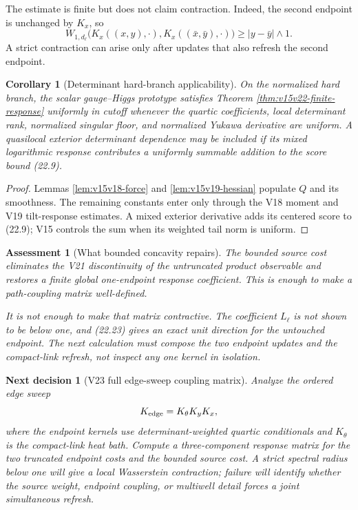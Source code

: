 \documentclass[11pt]{article}
\newtheorem{corollary}[theorem]{Corollary}
\newtheorem{decision}[theorem]{Next decision}
\newtheorem{assessment}[theorem]{Assessment}
\theoremstyle{remark}
\begin{document}
The estimate is finite but does not claim contraction.  Indeed, the
second endpoint is unchanged by \(K_x\), so
\[
 W_{1,d_\ell}
 \bigl(K_x((x,y),\cdot),K_x((\bar x,\bar y),\cdot)\bigr)
 \ge |y-\bar y|\wedge1.                                    \tag{22.23}
\]
A strict contraction can arise only after updates that also refresh
the second endpoint.

\begin{corollary}[Determinant hard-branch applicability]
\label{cor:v15v22-hard}
On the normalized hard branch, the scalar gauge--Higgs prototype
satisfies Theorem \ref{thm:v15v22-finite-response} uniformly in
cutoff whenever the quartic coefficients, local determinant rank,
normalized singular floor, and normalized Yukawa derivative are
uniform.  A quasilocal exterior determinant dependence may be
included if its mixed logarithmic response contributes a uniformly
summable addition to the score bound (22.9).
\end{corollary}

\begin{proof}
Lemmas \ref{lem:v15v18-force} and
\ref{lem:v15v19-hessian} populate \(Q\) and its smoothness.
The remaining constants enter only through the V18 moment and V19
tilt-response estimates.  A mixed exterior derivative adds its
centered score to (22.9); V15 controls the sum when its weighted
tail norm is uniform.
\end{proof}

\begin{assessment}[What bounded concavity repairs]
\label{ass:v15v22-reading}
The bounded source cost eliminates the V21 discontinuity of the
untruncated product observable and restores a finite global
one-endpoint response coefficient.  This is enough to make a
path-coupling matrix well-defined.

It is not enough to make that matrix contractive.  The coefficient
\(L_\ell\) is not shown to be below one, and (22.23) gives an exact
unit direction for the untouched endpoint.  The next calculation
must compose the two endpoint updates and the compact-link refresh,
not inspect any one kernel in isolation.
\end{assessment}

\begin{decision}[V23 full edge-sweep coupling matrix]
\label{dec:v15v22-next}
Analyze the ordered edge sweep
\[
 K_{\rm edge}=K_\theta K_yK_x,
\]
where the endpoint kernels use determinant-weighted quartic
conditionals and \(K_\theta\) is the compact-link heat bath.
Compute a three-component response matrix for the two truncated
endpoint costs and the bounded source cost.  A strict spectral
radius below one will give a local Wasserstein contraction; failure
will identify whether the source weight, endpoint coupling, or
multiwell detail forces a joint simultaneous refresh.
\end{decision}
\end{document}
